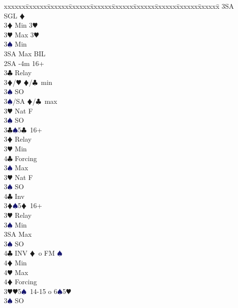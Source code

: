\documentclass[a4paper,italian]{article}
\newcommand{\BC}{\textcolor{OliveGreen}{$\clubsuit$}}
\newcommand{\BD}{\textcolor{RedOrange}{$\vardiamondsuit$}}
\newcommand{\BH}{\textcolor{Red2}{$\varheartsuit${}}}
\newcommand{\BS}{\textcolor{MidnightBlue}{$\spadesuit${}}}
\newenvironment{bidtable}
{\begin{tabbing}

    xxxxxx\=xxxxxx\=xxxxxx\=xxxxxx\=xxxxxx\=xxxxxx\=xxxxxx\=xxxxxx\=xxxxxx\=xxxxxx\=\kill}
{\end{tabbing} }%
\begin{document}
\begin{multicols}{2}
\begin{bidtable}
                                            3SA \> SGL \BD \-\-\\
                                            3\BD \> Min 3\BH \\
                                            3\BH \> Max 3\BH\\
                                            3\BS \> Min\\
                                            3SA \> Max BIL\-\-\\
                                            2SA -4m 16+\+\\
                                            3\BC \> Relay\+\\
                                            3\BD/\BH \> \BD /\BC\ min\+\\
                                            3\BS \> SO\-\\
                                            3\BS/SA \> \BD /\BC\ max\-\\
                                            3\BH \> Nat F\\
                                            3\BS \> SO\-\\
                                            3\BC {}\BS 5\BC\ 16+\+\\
                                            3\BD \> Relay\+\\
                                            3\BH \> Min\+\\
                                            4\BC \> Forcing\-\\
                                            3\BS \> Max\-\\
                                            3\BH \> Nat F\\
                                            3\BS \> SO\\
                                            4\BC \> Inv\-\\
                                            3\BD {}\BS 5\BD\ 16+\+\\
                                            3\BH \> Relay\+\\
                                            3\BS \> Min\\
                                            3SA \> Max\-\\
                                            3\BS \> SO\\
                                            4\BC \> INV \BD\ o FM \BS \+\\
                                            4\BD \> Min\\
                                            4\BH \> Max\-\\
                                            4\BD \> Forcing\-\\
                                            3\BH {}\BH 5\BS\ 14-15 o 6\BS 5\BH \+\\
                                            3\BS \> SO\-\-
                                        \end{bidtable}


\end{multicols}
\end{document}

